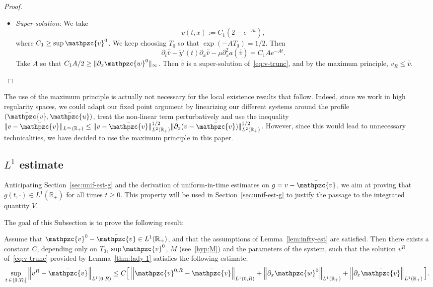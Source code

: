 \documentclass[AHL,Unicode,longabstracts,published]{cedram}
\newcommand{\R}{\mathbb{R}}
\newcommand{\p}{\partial}
\newcommand{\bv}{\bar{\mathpzc{v}}}
\newcommand{\bu}{\bar{\mathpzc{u}}}
\newcommand{\tv}{\mathpzc{v}}
\newcommand{\tw}{\mathpzc{w}}
\newcommand{\ty}{\widetilde{y}}
\newcommand{\bbv}{\overline{\overline{v}}}
\newcommand{\uuv}{\underline{\underline{v}}}
\begin{document}
\begin{proof}
\begin{itemize}
Note that by construction, we have $\uuv\leq v^R$ on the sets $\{t=0\}\cup\linebreak \{x=0\}\cup \{x=R\}$ provided $R$ is large enough.

Thus, by the maximum principle, $\uuv\leq v^R$.

\item \emph{Super-solution:} We take
\[
\bbv(t,x):= C_1\left(2 - e^{-At}\right),
\]
where $C_1\geq \sup \tv^0 $. We keep choosing $T_0$ so that $\exp(-AT_0)=1/2$. Then
\[
\partial_t \bbv - \ty'(t)\partial_x \bbv - \mu \partial^2_x a (\bbv)= C_1 A e^{-At}.
\]
Take $A$ so that $C_1 A/2\geq \|\p_x \tw^0\|_\infty$. Then $\bbv$ is a super-solution of~\eqref{eq:v-trunc}, and by the maximum principle, $v_R\leq \bbv$.
\end{itemize}
\end{proof}


\begin{rema}
The use of the maximum principle is actually not necessary for the local existence results that follow. Indeed, since we work in high regularity spaces, we could adapt our fixed point argument by linearizing our different systems around the profile $(\bv,\bu)$, treat the non-linear term perturbatively and use the inequality $\|v-\bv\|_{L^\infty(\R_+)} \leq \|v-\bv\|_{L^2(\R_+)}^{1/2} \|\partial_x(v -\bv)\|_{L^2(\R_+)}^{1/2}$. However, since this would lead to unnecessary technicalities, we have decided to use the maximum principle in this paper.
\end{rema}



\subsection{\texorpdfstring{$L^1$}{L1} estimate}

Anticipating Section~\ref{sec:unif-est-g} and the derivation of uniform-in-time estimates on $g = v-\bv$, we aim at proving that $g(t,\cdot) \in L^1(\R_+)$ for all times $t \geq 0$. This property will be used in Section~\ref{sec:unif-est-g} to justify the passage to the integrated quantity $V$.

The goal of this Subsection is to prove the following result:


\begin{lemm}\label{lem:L1-vR}
Assume that $\tv^0 -\bv \in L^1(\R_+)$, and that the assumptions of Lemma~\ref{lem:infty-est} are satisfied. Then there exists a constant $C$, depending only on $T_0$, $\sup \tv^0$, $M$ (see~\eqref{hyp:M}) and the parameters of the system, such that the solution $v^R$ of~\eqref{eq:v-trunc} provided by Lemma~\ref{thm:lady-1} satisfies the following estimate:
\begin{equation}\label{eq:L1-vR}
\sup_{t\,\in\,[0,T_0]} \left\|v^R - \bv\right\|_{L^1(0,R)}
\leq C \Big[\left\|\tv^{0,R} - \bv\right\|_{L^1(0,R)} + \left\|\partial_x \tw^0\right\|_{L^1(\R_+)} + \left\|\partial_x \bv\right\|_{L^1(\R_+)}\Big].
\end{equation}
\end{lemm}
\end{document}
